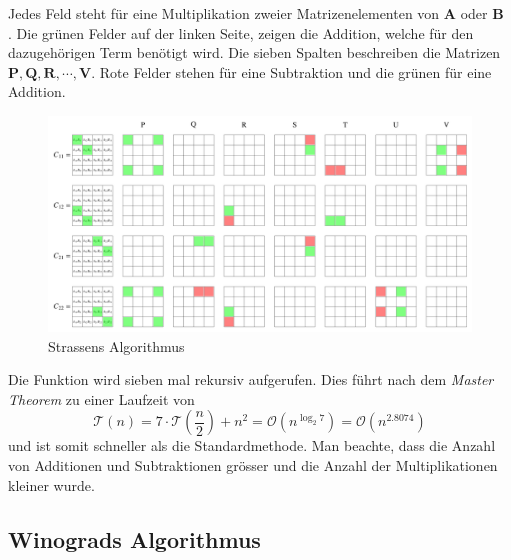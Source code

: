 Jedes Feld steht f\"ur eine Multiplikation zweier Matrizenelementen von $\mathbf{A}$ oder $\mathbf{B}$ .
Die gr\"unen Felder auf der linken Seite, zeigen die Addition, welche f\"ur den dazugeh\"origen Term ben\"otigt wird.
Die sieben Spalten beschreiben die Matrizen $\mathbf{P,Q,R, \dotsb, V}$.
Rote Felder stehen f\"ur eine Subtraktion und die gr\"unen f\"ur eine Addition.
\begin{figure}
	\center
	\includegraphics[width=\linewidth]{papers/multiplikation/images/strassen.pdf}
	\caption{Strassens Algorithmus}
	\label{multiplikation:fig:strassen}
\end{figure}

Die Funktion wird sieben mal rekursiv aufgerufen.
Dies f\"uhrt nach dem \textit{Master Theorem} zu einer Laufzeit von
\begin{equation} \label{multiplikation:eq:laufzeitstrassen}
\mathcal{T}(n) =
7 \cdot \mathcal{T}\left(\frac{n}{2}\right) + n^2  = \mathcal{O}(n^{\log_2 7} ) = \mathcal{O}(n^{2.8074}  )
\end{equation}
und ist somit schneller als die Standardmethode.
Man beachte, dass die Anzahl von Additionen und Subtraktionen gr\"osser und die Anzahl der Multiplikationen kleiner wurde.

\subsection{Winograds Algorithmus}

